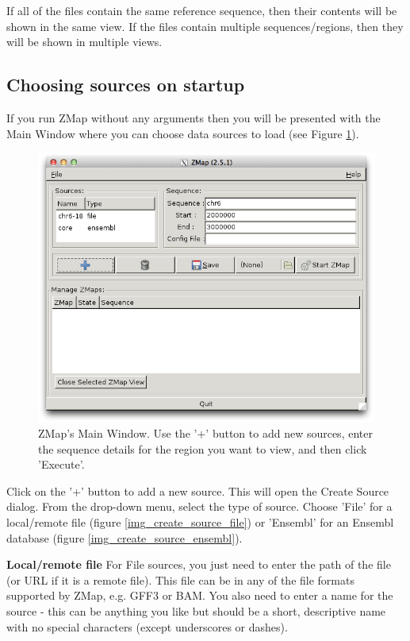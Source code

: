 \documentclass[letterpaper]{article}
\newcounter{Figure}
\begin{document}
If all of the files contain the same reference sequence, then their contents will be shown in the same view. If the files contain multiple sequences/regions, then they will be shown in multiple views.

\subsection{Choosing sources on startup}
If you run ZMap without any arguments then you will be presented with the Main Window where you can choose data sources to load (see Figure \ref{img_main_window}).

\begin{figure}
\centering
\color[rgb]{0.30980393,0.5058824,0.7411765}
\includegraphics[resolution=150]{img_main_window.png}
\caption{ZMap's Main Window. Use the '+' button to add new sources, enter the sequence details for the region you want to view, and then click 'Execute'.}
\label{img_main_window}
\end{figure}

Click on the '+' button to add a new source. This will open the Create Source dialog. From the drop-down menu, select the type of source. Choose 'File' for a local/remote file (figure \ref{img_create_source_file}) or 'Ensembl' for an Ensembl database (figure \ref{img_create_source_ensembl}).

\textbf{Local/remote file}
For File sources, you just need to enter the path of the file (or URL if it is a remote file). This file can be in any of the file formats supported by ZMap, e.g. GFF3 or BAM. You also need to enter a name for the source - this can be anything you like but should be a short, descriptive name with no special characters (except underscores or dashes).
\end{document}

